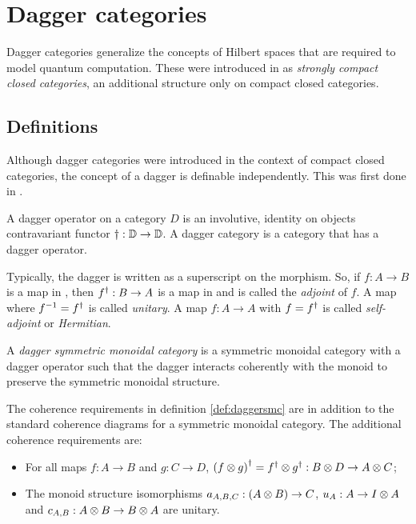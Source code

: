 \section{Dagger categories}\label{sec:daggercategories}
Dagger categories generalize the concepts of Hilbert spaces that are required to model quantum
computation. These were introduced in \cite{abramsky04:catsemquantprot} as \emph{strongly compact
closed categories}, an additional structure only on compact closed categories.


\subsection{Definitions}\label{sec:daggerdefinitions}

Although dagger categories were introduced in the context of compact closed categories, the concept
of a dagger is definable independently. This was first done in \cite{selinger05:dagger}.

\begin{definition}\label{def:daggercat}
  A dagger operator on a category $D$ is an involutive, identity on objects
  contravariant functor $\dagger:\mathbb{D}\to \mathbb{D}$. A dagger category
  is a category that has a dagger operator.
\end{definition}

Typically, the dagger is written as a superscript on the morphism. So, if $f:A\to B$ is a map in
\cD, then ${f}^{\dagger}:B\to A$ is a map in \cD{} and is called the \emph{adjoint} of $f$. A map where
$f^{-1} = {f}^{\dagger}$ is called \emph{unitary}. A map $f:A\to A$ with $f={f}^{\dagger}$ is called
\emph{self-adjoint} or \emph{Hermitian}.

\begin{definition}\label{def:daggersmc}
  A \emph{dagger symmetric monoidal category} is a symmetric monoidal category \cD{} with a dagger
  operator such that the dagger interacts coherently with the monoid to preserve the symmetric
  monoidal structure.
\end{definition}

The coherence requirements in definition \ref{def:daggersmc} are in addition to the standard
coherence diagrams for a symmetric monoidal category. The additional coherence requirements are:
\begin{itemize}
  \item For all maps $f:A\to B$ and $g:C\to D$, ${(f\otimes g)}^{\dagger} = {f}^{\dagger}\otimes{g}^{\dagger}:B\otimes D \to A\otimes C$;
  \item The monoid structure isomorphisms $a_{A,B,C}:(A\otimes B)\to C$, $u_{A}:A\to I\otimes A$ and
    $c_{A,B}:A\otimes B \to B\otimes A$ are unitary.
\end{itemize}

